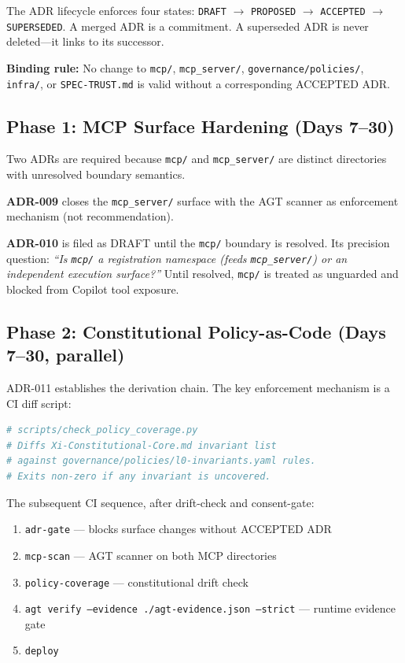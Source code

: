 \documentclass[12pt,a4paper]{article}
\theoremstyle{definition}
\theoremstyle{remark}
\begin{document}
The ADR lifecycle enforces four states: \texttt{DRAFT} $\to$ \texttt{PROPOSED}
$\to$ \texttt{ACCEPTED} $\to$ \texttt{SUPERSEDED}. A merged ADR is a
commitment. A superseded ADR is never deleted---it links to its successor.

\textbf{Binding rule:} No change to \texttt{mcp/}, \texttt{mcp\_server/},
\texttt{governance/policies/}, \texttt{infra/}, or \texttt{SPEC-TRUST.md}
is valid without a corresponding ACCEPTED ADR.

\subsection{Phase 1: MCP Surface Hardening (Days 7--30)}

Two ADRs are required because \texttt{mcp/} and \texttt{mcp\_server/} are
distinct directories with unresolved boundary semantics.

\textbf{ADR-009} closes the \texttt{mcp\_server/} surface with the AGT scanner
as enforcement mechanism (not recommendation).

\textbf{ADR-010} is filed as DRAFT until the \texttt{mcp/} boundary is resolved.
Its precision question: \emph{``Is \texttt{mcp/} a registration namespace
(feeds \texttt{mcp\_server/}) or an independent execution surface?''} Until
resolved, \texttt{mcp/} is treated as unguarded and blocked from Copilot tool
exposure.

\subsection{Phase 2: Constitutional Policy-as-Code (Days 7--30, parallel)}

ADR-011 establishes the derivation chain. The key enforcement mechanism
is a CI diff script:

\begin{lstlisting}[language=bash, caption={Policy Coverage Check}]
# scripts/check_policy_coverage.py
# Diffs Xi-Constitutional-Core.md invariant list
# against governance/policies/l0-invariants.yaml rules.
# Exits non-zero if any invariant is uncovered.
\end{lstlisting}

The subsequent CI sequence, after drift-check and consent-gate:

\begin{enumerate}[noitemsep]
  \item \texttt{adr-gate} --- blocks surface changes without ACCEPTED ADR
  \item \texttt{mcp-scan} --- AGT scanner on both MCP directories
  \item \texttt{policy-coverage} --- constitutional drift check
  \item \texttt{agt verify --evidence ./agt-evidence.json --strict} --- runtime evidence gate
  \item \texttt{deploy}
\end{enumerate}
\end{document}
